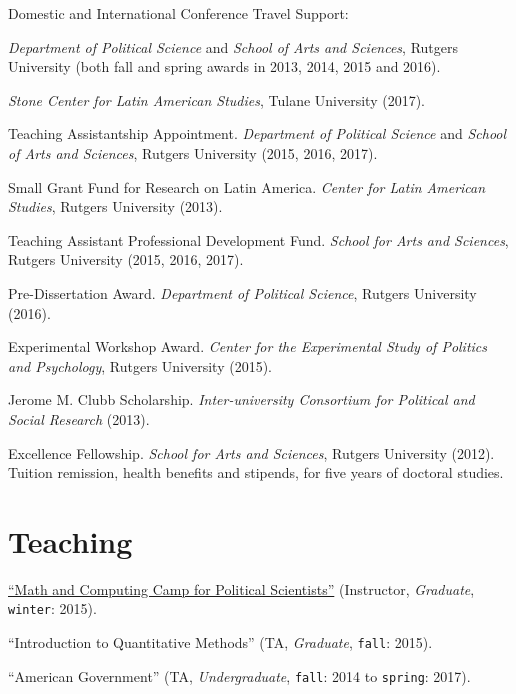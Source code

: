 \documentclass[letterpaper]{article}
\renewenvironment{itemize}{
  \begin{list}{}{
    \setlength{\leftmargin}{1.5em}
  }
}{
  \end{list}
}
\begin{document}
\begin{itemize}
\item Domestic and International Conference Travel Support: 
\begin{itemize}
	\item \emph{Department of Political Science} and \emph{School of Arts and Sciences}, Rutgers University (both fall and spring awards in 2013, 2014, 2015 and 2016).
	\item \emph{Stone Center for Latin American Studies}, Tulane University (2017).
\end{itemize}
\item Teaching Assistantship Appointment. \emph{Department of Political Science} and \emph{School of Arts and Sciences}, Rutgers University (2015, 2016, 2017).
\item Small Grant Fund for Research on Latin America. \emph{Center for Latin American Studies}, Rutgers University (2013).
\item Teaching Assistant Professional Development Fund. \emph{School for Arts and Sciences}, Rutgers University (2015, 2016, 2017).
\item Pre-Dissertation Award. \emph{Department of Political Science}, Rutgers University (2016).
\item Experimental Workshop Award. \emph{Center for the Experimental Study of Politics and Psychology}, Rutgers University (2015).
\item Jerome M. Clubb Scholarship. \emph{Inter-university Consortium for Political and Social Research} (2013).
\item Excellence Fellowship. \emph{School for Arts and Sciences}, Rutgers University (2012). Tuition remission, health benefits and stipends, for five years of doctoral studies.
\end{itemize}


\section*{Teaching}

\begin{itemize}
\item[$\bullet$] \href{http://github.com/hbahamonde/Math-Camp/raw/master/Syllabus/Math_Camp_Syllabus.pdf/}{``Math and Computing Camp for Political Scientists''} (Instructor, \emph{Graduate}, \texttt{winter}: 2015).
\item[$\bullet$] ``Introduction to Quantitative Methods'' (TA, \emph{Graduate}, \texttt{fall}: 2015).
\item[$\bullet$] ``American Government'' (TA, \emph{Undergraduate}, \texttt{fall}: 2014 to \texttt{spring}: 2017).
\end{itemize}
\end{document}
